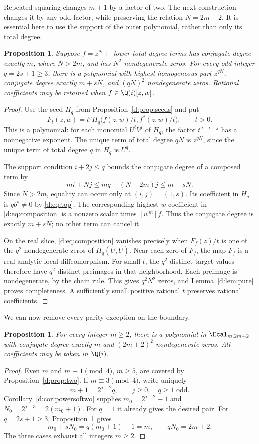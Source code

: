 \documentclass[UTF8,11pt]{ctexart}
\newtheorem{prop}[thm]{Proposition}
\theoremstyle{definition}
\numberwithin{equation}{section}
\begin{document}
Repeated squaring changes $m+1$ by a factor of two. The next construction
changes it by any odd factor, while preserving the relation $N=2m+2$.
It is essential here to use the support of the outer polynomial, rather
than only its total degree.
\begin{prop}\label{d:prop:composition}
Suppose $f=z^N+$ lower-total-degree terms has conjugate degree exactly
$m$, where $N>2m$, and has $N^2$ nondegenerate zeros. For every odd integer
$q=2s+1\ge3$, there is a polynomial with highest homogeneous part
$z^{qN}$, conjugate degree exactly $m+sN$, and $(qN)^2$ nondegenerate
zeros. Rational coefficients may be retained when $f\in\Q(i)[z,w]$.
\end{prop}
\begin{proof}
Use the seed $H_q$ from Proposition~\ref{d:prop:seeds} and put
\begin{equation}\label{d:eq:composition}
 F_t(z,w)=t^qH_q\bigl(f(z,w)/t,f^*(z,w)/t\bigr),\qquad t>0.
\end{equation}
This is a polynomial: for each monomial $U^iV^j$ of $H_q$, the factor
$t^{q-i-j}$ has a nonnegative exponent. The unique term of total degree
$qN$ is $z^{qN}$, since the unique term of total degree $q$ in $H_q$ is
$U^q$.

The support condition $i+2j\le q$ bounds the conjugate degree of a
composed term by
\[
 mi+Nj\le mq+(N-2m)j\le m+sN.
\]
Since $N>2m$, equality can occur only at $(i,j)=(1,s)$. Its coefficient
in $H_q$ is $qb^s\ne0$ by \eqref{d:eq:top}. The corresponding highest
$w$-coefficient in \eqref{d:eq:composition} is a nonzero scalar times
$[w^m]f$. Thus the conjugate degree is exactly $m+sN$; no other term can
cancel it.

On the real slice, \eqref{d:eq:composition} vanishes precisely when
$F_f(z)/t$ is one of the $q^2$ nondegenerate zeros of $H_q(U,\bar U)$.
Near each zero of $F_f$, the map $F_f$ is a real-analytic local
diffeomorphism. For small $t$, the $q^2$ distinct target values therefore
have $q^2$ distinct preimages in that neighborhood. Each preimage is
nondegenerate, by the chain rule. This gives $q^2N^2$ zeros, and
Lemma~\ref{d:lem:pure} proves completeness. A sufficiently small positive
rational $t$ preserves rational coefficients.
\end{proof}

We can now remove every parity exception on the boundary.
\begin{prop}\label{d:prop:boundary}
For every integer $m\ge2$, there is a polynomial in $\Ecal_{m,2m+2}$
with conjugate degree exactly $m$ and $(2m+2)^2$ nondegenerate zeros.
All coefficients may be taken in $\Q(i)$.
\end{prop}
\begin{proof}
Even $m$ and $m\equiv1\pmod4$, $m\ge5$, are covered by
Proposition~\ref{d:prop:two}.
If $m\equiv3\pmod4$, write uniquely
\[
 m+1=2^{j+2}q,\qquad j\ge0,\quad q\ge1\text{ odd}.
\]
Corollary~\ref{d:cor:powersoftwo} supplies
$m_0=2^{j+2}-1$ and $N_0=2^{j+3}=2(m_0+1)$.
For $q=1$ it already gives the desired pair.
For $q=2s+1\ge3$, Proposition~\ref{d:prop:composition} gives
\[
 m_0+sN_0=q(m_0+1)-1=m,\qquad qN_0=2m+2.
\]
The three cases exhaust all integers $m\ge2$.
\end{proof}
\end{document}
